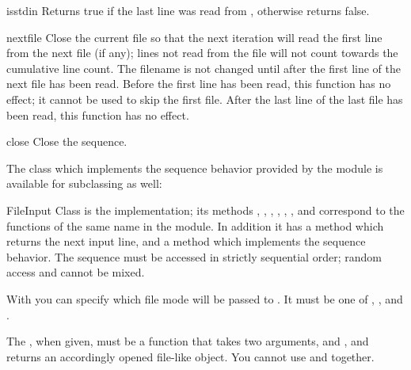 \begin{funcdesc}{isstdin}{}
  Returns true if the last line was read from ,
  otherwise returns false.
\end{funcdesc}

\begin{funcdesc}{nextfile}{}
  Close the current file so that the next iteration will read the
  first line from the next file (if any); lines not read from the file
  will not count towards the cumulative line count.  The filename is
  not changed until after the first line of the next file has been
  read.  Before the first line has been read, this function has no
  effect; it cannot be used to skip the first file.  After the last
  line of the last file has been read, this function has no effect.
\end{funcdesc}

\begin{funcdesc}{close}{}
  Close the sequence.
\end{funcdesc}


The class which implements the sequence behavior provided by the
module is available for subclassing as well:

\begin{classdesc}{FileInput}{}
  Class  is the implementation; its methods
  , , ,
  , , ,
   and  correspond to the functions
  of the same name in the module.
  In addition it has a  method which
  returns the next input line, and a  method
  which implements the sequence behavior.  The sequence must be
  accessed in strictly sequential order; random access and
   cannot be mixed.

  With  you can specify which file mode will be passed to
  . It must be one of , ,
   and .

  The , when given, must be a function that takes two arguments,
   and , and returns an accordingly opened
  file-like object.
  You cannot use  and  together.

\end{classdesc}

